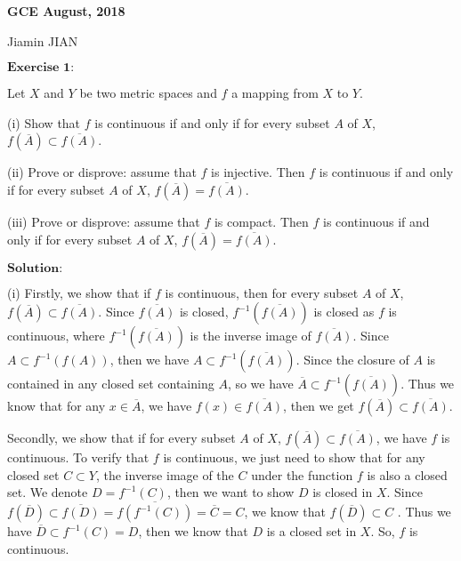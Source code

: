 \documentclass[12pt,a4paper]{ctexart}
\begin{document}
\begin{center}
\textbf{ GCE August, 2018}
\vspace{8pt}

Jiamin JIAN
\end{center}

\vspace{12pt}

$\textbf{Exercise 1:}$

Let $X$ and $Y$ be two metric spaces and $f$ a mapping from $X$ to $Y$.

(i) Show that $f$ is continuous if and only if for every subset $A$ of $X$, $f(\overline{A}) \subset  \overline{f(A)}$.

(ii) Prove or disprove: assume that $f$ is injective. Then $f$ is continuous if and only if for every subset $A$ of $X$, $f(\overline{A}) = \overline{f(A)}$. 

(iii) Prove or disprove: assume that $f$ is compact. Then $f$ is continuous if and only if for every subset $A$ of $X$, $f(\overline{A}) = \overline{f(A)}$. 

\vspace{8pt}

$\textbf{Solution:}$

(i) Firstly, we show that if $f$ is continuous, then for every subset $A$ of $X$, $f(\overline{A}) \subset  \overline{f(A)}$. Since $\overline{f(A)}$ is closed, $f^{-1}(\overline{f(A)})$ is closed as $f$ is continuous, where $f^{-1}(\overline{f(A)})$ is the inverse image of $\overline{f(A)}$. Since $A \subset f^{-1} (f(A))$, then we have $A \subset f^{-1}( \overline{f(A)})$. Since the closure of $A$ is contained in any closed set containing $A$, so we have $\overline{A} \subset f^{-1} (\overline{f(A)})$. Thus we know that for any $x \in \overline{A}$, we have $f(x) \in \overline{f(A)}$, then we get $f(\overline{A}) \subset  \overline{f(A)}$.

Secondly, we show that if for every subset $A$ of $X$, $f(\overline{A}) \subset  \overline{f(A)}$, we have $f$ is continuous. To verify that $f$ is continuous, we just need to show that for any closed set $C \subset Y$, the inverse image of the $C$ under the function $f$ is also a closed set. We denote $D = f^{-1}(C)$, then we want to show $D$ is closed in $X$. Since $f(\overline{D}) \subset \overline{f(D)} = \overline{f(f^{-1}(C))} = \overline{C} = C$, we know that $f(\overline{D}) \subset C$
. Thus we have $\overline{D} \subset f^{-1}(C) = D$, then we know that $D$ is a closed set in $X$. So, $f$ is continuous.
\end{document}
